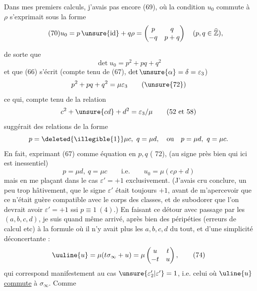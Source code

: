 Dans mes premiers calculs, j'avais pas encore  (69), où la condition $u_0$ commute à $\rho$ s'exprimait sous la forme
\[
\tag{70}u_0=p\,\unsure{\mathrm{id}}+q\rho=\begin{pmatrix}p&q\\-q&p+q\end{pmatrix}\quad(p,q\in\widehat{\mathbb Z}),
\]


de sorte que
\[
\det u_0=p^2+pq+q^2
\tag{71}
\]
et que (66) s'écrit (compte tenu de (67), 
$\det\unsure{\alpha}=\delta=\varepsilon_3$)
\[
p^2+pq+q^2=\mu\varepsilon_3
\tag{\unsure{72}}
\]
ce qui, compte tenu de la relation
\[
c^2+\unsure{cd}+d^2=\varepsilon_3/\mu
\qquad(52\text{ et }58)
\]
suggérait des relations de la forme
\[
p=\deleted{\illegible{1}}\mu c,\ q=\mu d,\quad
\text{ou}\quad p=\mu d,\ q=\mu c.
\]
En fait, exprimant (67) comme équation en $p,q$
(  72), 
(au signe près bien 
qui ici est inessentiel)
\[
p=\mu d,\ q=\mu c\qquad\text{i.e.}\qquad u_0=\mu(c\rho+d)
\tag{73}
\]
mais en me plaçant dans le cas $\varepsilon'=+1$ exclusivement.
(J'avais cru conclure, un peu trop hâtivement, que le
signe $\varepsilon'$ était toujours $+1$, avant de m'apercevoir
que ce n'était guère compatible avec le corps des
classes, et de subodorer que l'on devrait avoir $\varepsilon'=+1$
ssi $p\equiv1\ (4)$.) En faisant ce détour avec passage
par les $(a,b,c,d)$, je suis quand même arrivé, après
bien des péripéties (erreurs de calcul etc) à la
formule où il n'y avait plus les $a,b,c,d$ du tout,
et d'une simplicité déconcertante :
\[
\uuline{u}=\mu(t\sigma_\infty+u)
=\mu\begin{pmatrix}u&t\\-t&u\end{pmatrix},
\tag{74}
\]
qui correspond manifestement au cas $\unsure{\varepsilon'_2|\varepsilon'}=1$, i.e.
celui où $\uline{u}$ \uline{commute} à $\sigma_\infty$. Comme



